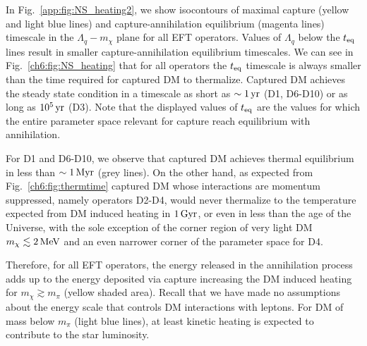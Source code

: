 In Fig.~\ref{app:fig:NS_heating2}, we show isocontours of maximal capture (yellow and light blue lines) and capture-annihilation equilibrium (magenta lines) timescale in the $\Lambda_q-m_\chi$ plane for all  EFT operators.  
Values of $\Lambda_q$ below the $t_{\rm eq}$ lines result in smaller capture-annihilation equilibrium timescales. 
We can see in Fig.~\ref{ch6:fig:NS_heating} that for all operators the $t_{\rm eq}$ timescale is always smaller than the time required for captured DM to thermalize. Captured DM achieves the steady state condition in a timescale as short as $\sim1{\rm \,yr}$ (D1, D6-D10) or as long as $10^5{\rm \,yr}$ (D3). 
Note that the displayed values of $t_{\rm eq}$ are the values for which the entire parameter space relevant for capture reach equilibrium with annihilation. 

For D1 and D6-D10, we observe that captured DM achieves thermal equilibrium in less than $\sim 1{\rm \,Myr}$ (grey lines). 
On the other hand, as expected from Fig.~\ref{ch6:fig:thermtime} captured DM whose interactions are momentum suppressed, namely operators D2-D4, would never thermalize to the temperature expected from DM induced heating in $1{\rm \,Gyr}$, or even in less than the age of the 
Universe,
with the sole exception of the corner region of very light DM $m_\chi\lesssim 2{\rm \,MeV}$ and an even narrower corner of the parameter space for D4. 

Therefore, for all EFT operators,  the energy released in the annihilation process adds up to the energy deposited via capture increasing the DM induced heating  
for $m_\chi\gtrsim m_\pi$ (yellow shaded area). 
Recall that we have made no assumptions about the energy scale that controls DM interactions with leptons. 
For DM of mass below $m_\pi$ (light blue lines), at least kinetic heating is expected to contribute to the star luminosity.  
